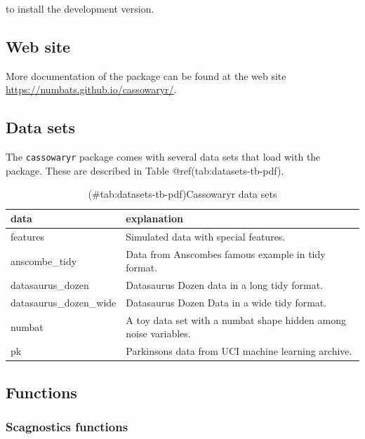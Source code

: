 to install the development version.

\hypertarget{web-site}{%
\subsection{Web site}\label{web-site}}

More documentation of the package can be found at the web site
\url{https://numbats.github.io/cassowaryr/}.

\hypertarget{data-sets}{%
\subsection{Data sets}\label{data-sets}}

The \texttt{cassowaryr} package comes with several data sets that load
with the package. These are described in Table
@ref(tab:datasets-tb-pdf).

\begin{Schunk}
\begin{table}

\caption{(\#tab:datasets-tb-pdf)Cassowaryr data sets}
\centering
\begin{tabular}[t]{>{\raggedright\arraybackslash}p{4cm}>{\raggedright\arraybackslash}p{8cm}}
\toprule
data & explanation\\
\midrule
features & Simulated data with special features.\\
anscombe\_tidy & Data from Anscombes famous example in tidy format.\\
datasaurus\_dozen & Datasaurus Dozen data in a long tidy format.\\
datasaurus\_dozen\_wide & Datasaurus Dozen Data in a wide tidy format.\\
numbat & A toy data set with a numbat shape hidden among noise variables.\\
\addlinespace
pk & Parkinsons data from UCI machine learning archive.\\
\bottomrule
\end{tabular}
\end{table}

\end{Schunk}

\hypertarget{functions}{%
\subsection{Functions}\label{functions}}

\hypertarget{scagnostics-functions}{%
\subsubsection{Scagnostics functions}\label{scagnostics-functions}}

